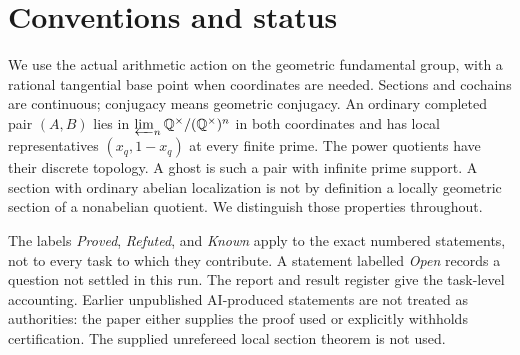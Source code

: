 \documentclass[11pt,a4paper]{article}
\begin{document}
\begin{abstract}
We additionally prove that selected outputs of the original factorial family
first fail at pro-five class four. A different primitive-five support family
has a common twenty-five-element class-four matching catalog, and a selected
subfamily has an off-five matched class-four lift. The already proved
nonresonant steps preserve matching through class seven and give a global
class-eight lift. Weight-eight matching and all-depth survival remain open.
Relative coefficient interpolation is proved at fixed classes two, three
and four with its actual arithmetic compatibility hypotheses; it is not a
nilpotency-class transition.
An explicit finite characteristic pro-prime quotient separates interior
point sections from cusp sections over finite fields, with the full
arithmetic action retained. This is a local detector, not a global
finite-support theorem.

We also identify the odd-prime Heisenberg-cover genera, repair the exponent-two
exception, and prove the relevant comparison for passage to covers.
The full-section consequence of a positive answer is stronger than the
prompt states: Stix's theorem already resolves the locally ordinary case
with rational abelian pair. Every unresolved assertion is retained as such;
the audit register distinguishes complete proofs from unfinished checks.
No priority is claimed, and no result is attributed to a human contributor.
\end{abstract}
\begingroup\small\tableofcontents\endgroup
\newpage
\section*{Conventions and status}
We use the actual arithmetic action on the geometric fundamental group,
with a rational tangential base point when coordinates are needed.
Sections and cochains are continuous; conjugacy means geometric conjugacy.
An ordinary completed pair \((A,B)\) lies in
\(\varprojlim_n\mathbb Q^\times/(\mathbb Q^\times)^n\) in both coordinates
and has local representatives \((x_q,1-x_q)\) at every finite prime.
The power quotients have their discrete topology. A ghost is such a pair
with infinite prime support. A section with ordinary abelian localization
is not by definition a locally geometric section of a nonabelian quotient.
We distinguish those properties throughout.

The labels \emph{Proved}, \emph{Refuted}, and \emph{Known} apply to the exact
numbered statements, not to every task to which they contribute. A statement
labelled \emph{Open} records a question not settled in this run. The report
and result register give the task-level accounting. Earlier unpublished
AI-produced statements are not treated as authorities: the paper either
supplies the proof used or explicitly withholds certification. The supplied
unrefereed local section theorem is not used.
\end{document}
